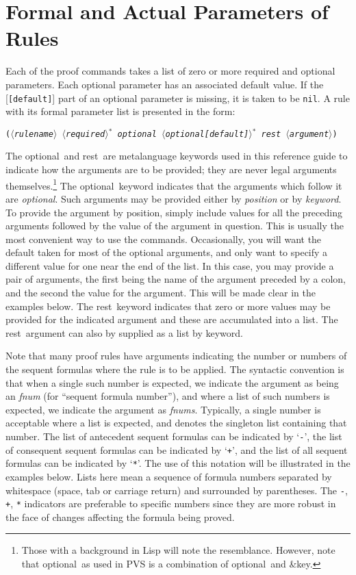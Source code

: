 \documentclass[12pt]{book}
\def\optl{{\smaller\sc {\smaller\smaller \&}optional}}
\def\rest{{\smaller\sc {\smaller\smaller \&}rest}}
\def\default#1{\textrm{[\texttt{#1}]}}
\def\bkt#1{{$\langle$#1$\rangle$}}
\newcommand{\carg}[1]{\textrm{\emph{#1}}\index{#1}}
\newcommand{\cargdflt}[2]{\carg{#1}\default{#2}}
\begin{document}
\section{Formal and Actual Parameters of Rules}
Each of the proof commands takes a list of zero or more required and
optional parameters.  Each optional parameter has an associated default
value.  If the  \cargdflt{}{[default]} part of an optional parameter is
missing, it is taken to be \texttt{nil}.  A rule with its formal parameter
list is presented in the form:
\begin{center}
  \texttt{(\carg{\bkt{rulename} \bkt{required}$^{\textstyle *}$
        \optl\ \bkt{\textrm{\emph{optional}}\default{default}}$^{\textstyle *}$
        \rest\ \bkt{argument}})}
\end{center}
The \optl\ and \rest\ are metalanguage keywords used in this reference
guide to indicate how the arguments are to 
be provided; they are never legal arguments themselves.\footnote{Those
with a background in Lisp will note the resemblance.  However, note that
\optl\ as used in PVS is a combination of \optl\ and {{\smaller\sc
{\smaller\smaller \&}key}}.} The \optl\ keyword indicates that the
arguments which follow it are \emph{optional}.  Such arguments may be
provided either by \emph{position} or by \emph{keyword}.  To provide
the argument by position, simply include values for all the preceding
arguments followed by the value of the argument in question.  This is
usually the most convenient way to use the commands.  Occasionally, you
will want the default taken for most of the optional arguments, and only
want to specify a different value for one near the end of the list.  In
this case, you may provide a pair of arguments, the first being the name
of the argument preceded by a colon, and the second the value for the
argument.  This will be made clear in the examples below.  The \rest\
keyword indicates that zero or more values may be provided for the
indicated argument and these are accumulated into a list.  The \rest\
argument can also by supplied as a list by keyword.  

Note that many proof rules have arguments indicating the number or numbers
of the sequent formulas where the rule is to be applied.  The syntactic
convention is that when a single such number is expected, we indicate the
argument as being an \emph{fnum} (for ``sequent formula number''), and
where a list of such numbers is expected, we indicate the argument as
\emph{fnums}.  Typically, a single number is acceptable where a list is
expected, and denotes the singleton list containing that number.  The list
of antecedent sequent formulas can be indicated by `\texttt{-}', the list
of consequent sequent formulas can be indicated by `\texttt{+}', and the
list of all sequent formulas can be indicated by `\texttt{*}'.  The use of
this notation will be illustrated in the examples below.  Lists here mean
a sequence of formula numbers separated by whitespace (space, tab or
carriage return) and surrounded by parentheses.  The \texttt{-},
\texttt{+}, \texttt{*} indicators are preferable to specific numbers since
they are more robust in the face of changes affecting the formula being
proved.
\end{document}
